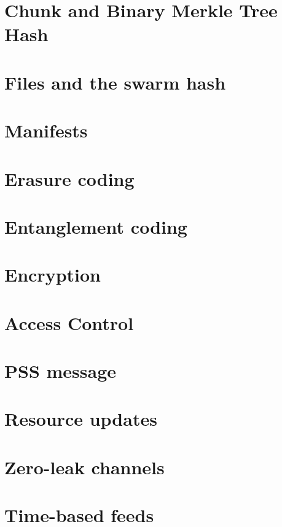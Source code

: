 \section{Chunk and Binary Merkle Tree Hash}\label{spec:format:bmt}

\section{Files and the swarm hash}\label{spec:format:files}

\section{Manifests}\label{spec:format:manifests}

\section{Erasure coding}\label{spec:format:erasure}

\section{Entanglement coding}\label{spec:format:entanglements}
%
\section{Encryption}\label{spec:format:encryption}

\section{Access Control}\label{spec:format:access-control}

\section{PSS message}\label{spec:format:pss-messsage}

\section{Resource updates}\label{spec:format:resource-updates}
%
\section{Zero-leak channels}\label{spec:format:zero-leak-channels}
%
\section{Time-based feeds}\label{spec:format:time-based-feeds}
%
